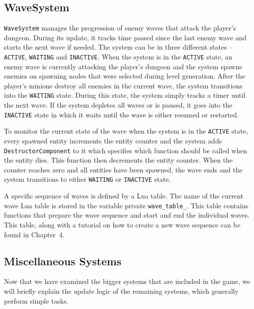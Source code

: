 \subsection{WaveSystem}

\texttt{WaveSystem} manages the progression of enemy waves that attack the player's dungeon. During its update, it tracks time passed
since the last enemy wave and starts the next wave if needed. The system can be in three different states -- \texttt{ACTIVE},
\texttt{WAITING} and \texttt{INACTIVE}. When the system is in the \texttt{ACTIVE} state, an enemy wave is currently attacking the player's
dungeon and the system spawns enemies on spawning nodes that were selected during level generation. After the player's minions destroy
all enemies in the current wave, the system transitions into the \texttt{WAITING} state. During this state, the system simply tracks
a timer until the next wave. If the system depletes all waves or is paused, it goes into the \texttt{INACTIVE} state
in which it waits until the wave is either resumed or restarted.

To monitor the current state of the wave when the system is in the \texttt{ACTIVE} state, every spawned entity increments the entity
counter and the system adds \texttt{DestructorComponent} to it which specifies which function should be called when the entity dies.
This function then decrements the entity counter. When the counter reaches zero and all entities have been spawned, the wave ends and
the system transitions to either \texttt{WAITING} or \texttt{INACTIVE} state.

A specific sequence of waves is defined by a Lua table. The name of the current wave Lua table is stored in the variable private
\texttt{wave\_table\_}. This table contains functions that prepare the wave sequence and start and end the individual waves. This table,
along with a tutorial on how to create a new wave sequence can be found in Chapter~4.

\subsection{Miscellaneous Systems}

Now that we have examined the bigger systems that are included in the game, we will briefly explain the update logic of the remaining
systems, which generally perform simple tasks.

